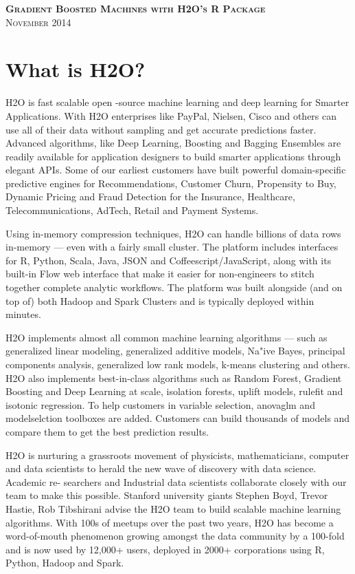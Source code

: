 \documentclass[11pt]{article}
\begin{document}
\thispagestyle{empty} %

\begin{center}
\textsc{\Large\bf{Gradient Boosted Machines with H2O's R Package}}
\\

\textsc{November 2014}
\end{center}
\tableofcontents

\newpage
\section{What is H2O?}

H2O is fast scalable open -source machine learning and deep learning for Smarter Applications. With H2O enterprises like PayPal, Nielsen, Cisco and others can use all of their data without sampling and get accurate predictions faster. Advanced algorithms, like Deep Learning, Boosting and Bagging Ensembles are readily available for application designers to build smarter applications through elegant APIs. Some of our earliest customers have built powerful domain-specific predictive engines for Recommendations, Customer Churn, Propensity to Buy, Dynamic Pricing and Fraud Detection for the Insurance, Healthcare, Telecommunications, AdTech,
Retail and Payment Systems.

Using in-memory compression techniques, H2O can handle billions of data rows in-memory — even with a fairly small cluster. The platform includes interfaces for R, Python, Scala, Java, JSON and Coffeescript/JavaScript, along with its built-in Flow web interface that make it easier for non-engineers to stitch together complete analytic workflows. The platform was built alongside (and on top of) both Hadoop and Spark Clusters and is typically deployed within minutes.

H2O implements almost all common machine learning algorithms — such as generalized linear modeling, generalized additive models, Na"{i}ve Bayes, principal components analysis, generalized low rank models, k-means clustering and others. H2O also implements best-in-class algorithms such as Random Forest, Gradient Boosting and Deep Learning at scale, isolation forests, uplift models, rulefit and isotonic regression. To help customers in variable selection, anovaglm and modelselction toolboxes are added. Customers can build thousands of models and compare them to get the best prediction results.

H2O is nurturing a grassroots movement of physicists, mathematicians, computer and data scientists to herald the new wave of discovery with data science. Academic re- searchers and Industrial data scientists collaborate closely with our team to make this possible. Stanford university giants Stephen Boyd, Trevor Hastie, Rob Tibshirani advise the H2O team to build scalable machine learning algorithms. With 100s of meetups over the past two years, H2O has become a word-of-mouth phenomenon growing amongst the data community by a 100-fold and is now used by 12,000+ users, deployed in 2000+ corporations using R, Python, Hadoop and Spark.
\end{document}
